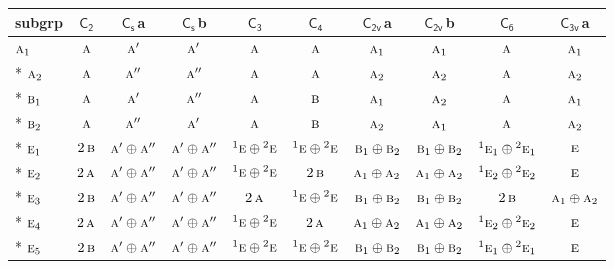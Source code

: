 \documentclass[10pt,a4paper]{article}
\numberwithin{equation}{section}
\newcommand{\grp}[1]{\mathsf{#1}}
\newcommand{\irr}[1]{\text{\normalfont\scshape #1}}
\newcommand{\conjpair}[1]{{}^{#1}}
\newcommand{\clsletter}[1]{\,{\scriptsize\color{black!55}#1}}
\begin{document}
{\small\begin{longtable}{@{}lccccccccc@{}}\toprule
subgrp & \href{C2.pdf}{$\grp{C_{2}}$} & \href{C1v.pdf}{$\grp{C_{s}}$}\clsletter{a} & \href{C1v.pdf}{$\grp{C_{s}}$}\clsletter{b} & \href{C3.pdf}{$\grp{C_{3}}$} & \href{C4.pdf}{$\grp{C_{4}}$} & \href{C2v.pdf}{$\grp{C_{2v}}$}\clsletter{a} & \href{C2v.pdf}{$\grp{C_{2v}}$}\clsletter{b} & \href{C6.pdf}{$\grp{C_{6}}$} & \href{C3v.pdf}{$\grp{C_{3v}}$}\clsletter{a}\\\midrule\endhead
\bottomrule\endfoot\endlastfoot
$\irr{a}_{1}$ & $\irr{a}$ & $\irr{a}'$ & $\irr{a}'$ & $\irr{a}$ & $\irr{a}$ & $\irr{a}_{1}$ & $\irr{a}_{1}$ & $\irr{a}$ & $\irr{a}_{1}$\\*
$\irr{a}_{2}$ & $\irr{a}$ & $\irr{a}''$ & $\irr{a}''$ & $\irr{a}$ & $\irr{a}$ & $\irr{a}_{2}$ & $\irr{a}_{2}$ & $\irr{a}$ & $\irr{a}_{2}$\\*
$\irr{b}_{1}$ & $\irr{a}$ & $\irr{a}'$ & $\irr{a}''$ & $\irr{a}$ & $\irr{b}$ & $\irr{a}_{1}$ & $\irr{a}_{2}$ & $\irr{a}$ & $\irr{a}_{1}$\\*
$\irr{b}_{2}$ & $\irr{a}$ & $\irr{a}''$ & $\irr{a}'$ & $\irr{a}$ & $\irr{b}$ & $\irr{a}_{2}$ & $\irr{a}_{1}$ & $\irr{a}$ & $\irr{a}_{2}$\\*
$\irr{e}_{1}$ & $2\,\irr{b}$ & $\irr{a}'\oplus \irr{a}''$ & $\irr{a}'\oplus \irr{a}''$ & $\conjpair{1}\irr{e}\oplus \conjpair{2}\irr{e}$ & $\conjpair{1}\irr{e}\oplus \conjpair{2}\irr{e}$ & $\irr{b}_{1}\oplus \irr{b}_{2}$ & $\irr{b}_{1}\oplus \irr{b}_{2}$ & $\conjpair{1}\irr{e}_{1}\oplus \conjpair{2}\irr{e}_{1}$ & $\irr{e}$\\*
$\irr{e}_{2}$ & $2\,\irr{a}$ & $\irr{a}'\oplus \irr{a}''$ & $\irr{a}'\oplus \irr{a}''$ & $\conjpair{1}\irr{e}\oplus \conjpair{2}\irr{e}$ & $2\,\irr{b}$ & $\irr{a}_{1}\oplus \irr{a}_{2}$ & $\irr{a}_{1}\oplus \irr{a}_{2}$ & $\conjpair{1}\irr{e}_{2}\oplus \conjpair{2}\irr{e}_{2}$ & $\irr{e}$\\*
$\irr{e}_{3}$ & $2\,\irr{b}$ & $\irr{a}'\oplus \irr{a}''$ & $\irr{a}'\oplus \irr{a}''$ & $2\,\irr{a}$ & $\conjpair{1}\irr{e}\oplus \conjpair{2}\irr{e}$ & $\irr{b}_{1}\oplus \irr{b}_{2}$ & $\irr{b}_{1}\oplus \irr{b}_{2}$ & $2\,\irr{b}$ & $\irr{a}_{1}\oplus \irr{a}_{2}$\\*
$\irr{e}_{4}$ & $2\,\irr{a}$ & $\irr{a}'\oplus \irr{a}''$ & $\irr{a}'\oplus \irr{a}''$ & $\conjpair{1}\irr{e}\oplus \conjpair{2}\irr{e}$ & $2\,\irr{a}$ & $\irr{a}_{1}\oplus \irr{a}_{2}$ & $\irr{a}_{1}\oplus \irr{a}_{2}$ & $\conjpair{1}\irr{e}_{2}\oplus \conjpair{2}\irr{e}_{2}$ & $\irr{e}$\\*
$\irr{e}_{5}$ & $2\,\irr{b}$ & $\irr{a}'\oplus \irr{a}''$ & $\irr{a}'\oplus \irr{a}''$ & $\conjpair{1}\irr{e}\oplus \conjpair{2}\irr{e}$ & $\conjpair{1}\irr{e}\oplus \conjpair{2}\irr{e}$ & $\irr{b}_{1}\oplus \irr{b}_{2}$ & $\irr{b}_{1}\oplus \irr{b}_{2}$ & $\conjpair{1}\irr{e}_{1}\oplus \conjpair{2}\irr{e}_{1}$ & $\irr{e}$\\
\bottomrule\end{longtable}}
\end{document}
